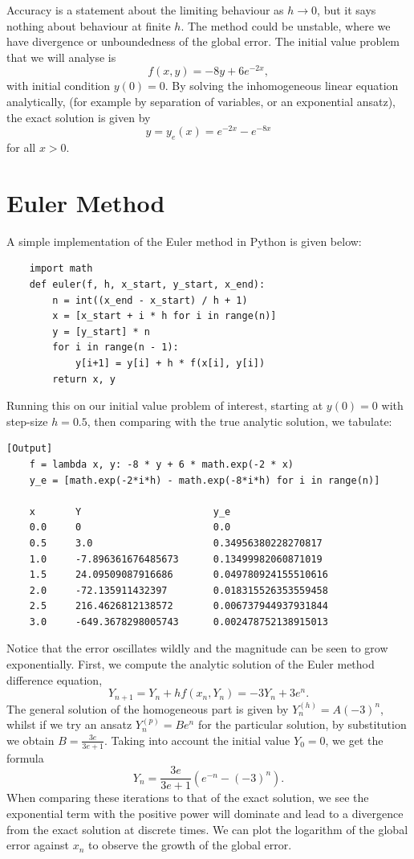 \documentclass{article}
\begin{document}
Accuracy is a statement about the limiting behaviour as \(h \to 0\), but it says nothing about behaviour at finite \(h\). The method could be unstable, where we have divergence or unboundedness of the global error. The initial value problem that we will analyse is
\[f(x, y) = -8y + 6e^{-2x}, \]
with initial condition \(y(0) = 0\). By solving the inhomogeneous linear equation analytically, (for example by separation of variables, or an exponential ansatz), the exact solution is given by
\[ y = y_e(x) = e^{-2x} - e^{-8x} \]
for all \(x > 0\).

\section{Euler Method}
A simple implementation of the Euler method in Python is given below:

\begin{verbatim}
    import math
    def euler(f, h, x_start, y_start, x_end):
        n = int((x_end - x_start) / h + 1)
        x = [x_start + i * h for i in range(n)]
        y = [y_start] * n
        for i in range(n - 1):
            y[i+1] = y[i] + h * f(x[i], y[i])
        return x, y
\end{verbatim}

Running this on our initial value problem of interest, starting at \(y(0) = 0\) with step-size \(h = 0.5\), then comparing with the true analytic solution, we tabulate:

\begin{verbatim}[Output]
    f = lambda x, y: -8 * y + 6 * math.exp(-2 * x)
    y_e = [math.exp(-2*i*h) - math.exp(-8*i*h) for i in range(n)]
    
    x       Y                       y_e
    0.0     0                       0.0
    0.5     3.0                     0.34956380228270817
    1.0     -7.896361676485673      0.13499982060871019
    1.5     24.09509087916686       0.049780924155510616
    2.0     -72.135911432397        0.018315526353559458
    2.5     216.4626812138572       0.006737944937931844
    3.0     -649.3678298005743      0.002478752138915013
\end{verbatim}

Notice that the error oscillates wildly and the magnitude can be seen to grow exponentially. First, we compute the analytic solution of the Euler method difference equation,
\[  Y_{n+1} = Y_n + hf(x_n, Y_n) = -3Y_n + 3e^n. \]
The general solution of the homogeneous part is given by \(Y^{(h)}_n = A(-3)^n\), whilst if we try an ansatz \(Y^{(p)}_n = Be^n\) for the particular solution, by substitution we obtain \(B = \frac{3e}{3e + 1}\). Taking into account the initial value \(Y_0 = 0\), we get the formula
\[ Y_n = \frac{3e}{3e + 1}(e^{-n} - (-3)^n). \]
When comparing these iterations to that of the exact solution, we see the exponential term with the positive power will dominate and lead to a divergence from the exact solution at discrete times. We can plot the logarithm of the global error against \(x_n\) to observe the growth of the global error.
\end{document}
